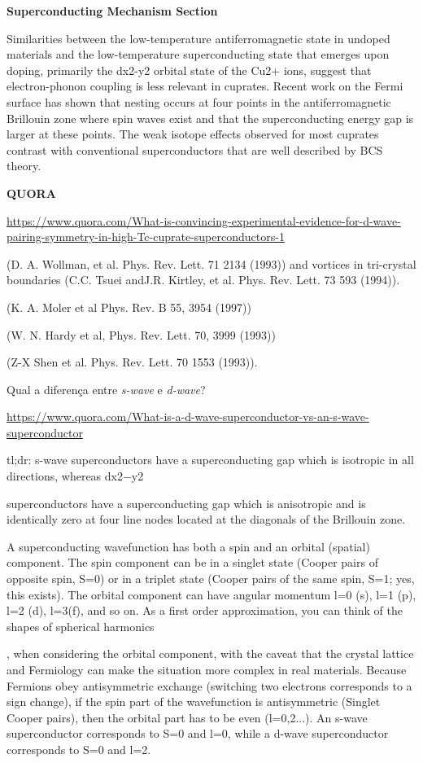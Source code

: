 \documentclass[a4paper,11pt]{article}
\begin{document}
\textbf{Superconducting Mechanism Section}

Similarities between the low-temperature antiferromagnetic state in undoped materials and the low-temperature superconducting state that emerges upon doping, primarily the dx2-y2 orbital state of the Cu2+ ions, suggest that electron-phonon coupling is less relevant in cuprates. Recent work on the Fermi surface has shown that nesting occurs at four points in the antiferromagnetic Brillouin zone where spin waves exist and that the superconducting energy gap is larger at these points. The weak isotope effects observed for most cuprates contrast with conventional superconductors that are well described by BCS theory.

\textbf{QUORA}

\url{https://www.quora.com/What-is-convincing-experimental-evidence-for-d-wave-pairing-symmetry-in-high-Tc-cuprate-superconductors-1}

(D. A. Wollman, et al. Phys. Rev. Lett. 71 2134 (1993)) and vortices in tri-crystal boundaries (C.C. Tsuei andJ.R. Kirtley, et al. Phys. Rev. Lett. 73 593 (1994)).

(K. A. Moler et al Phys. Rev. B 55, 3954 (1997))

(W. N. Hardy et al, Phys. Rev. Lett. 70, 3999 (1993))

(Z-X Shen et al. Phys. Rev. Lett. 70 1553 (1993)).

\n

Qual a diferença entre \textit{s-wave} e \textit{d-wave}?

\url{https://www.quora.com/What-is-a-d-wave-superconductor-vs-an-s-wave-superconductor}

tl;dr: s-wave superconductors have a superconducting gap which is isotropic in all directions, whereas dx2−y2

superconductors have a superconducting gap which is anisotropic and is identically zero at four line nodes located at the diagonals of the Brillouin zone.

A superconducting wavefunction has both a spin and an orbital (spatial) component. The spin component can be in a singlet state
(Cooper pairs of opposite spin, S=0) or in a triplet state
(Cooper pairs of the same spin, S=1; yes, this exists). The orbital component can have angular momentum l=0 (s), l=1 (p), l=2 (d), l=3(f), and so on. As a first order approximation, you can think of the shapes of spherical harmonics

, when considering the orbital component, with the caveat that the crystal lattice and Fermiology can make the situation more complex in real materials. Because Fermions obey antisymmetric exchange (switching two electrons corresponds to a sign change), if the spin part of the wavefunction is antisymmetric (Singlet Cooper pairs), then the orbital part has to be even (l=0,2...). An s-wave superconductor corresponds to S=0 and l=0, while a d-wave superconductor corresponds to S=0 and l=2.
\end{document}
